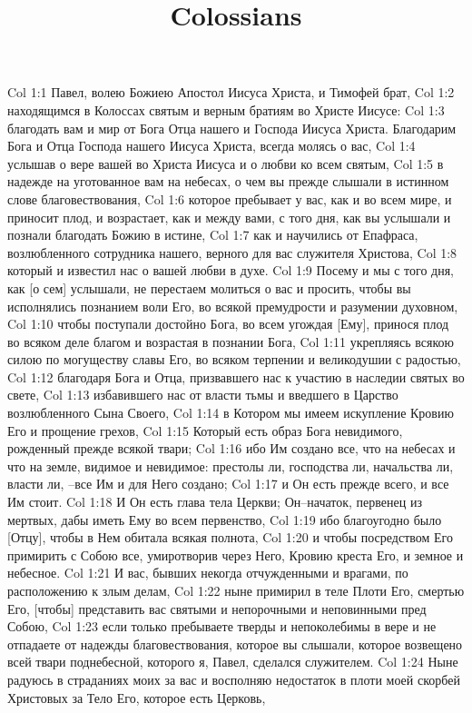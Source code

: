 

\title{Colossians}

Col 1:1  Павел, волею Божиею Апостол Иисуса Христа, и Тимофей брат,
Col 1:2  находящимся в Колоссах святым и верным братиям во Христе Иисусе:
Col 1:3  благодать вам и мир от Бога Отца нашего и Господа Иисуса Христа. Благодарим Бога и Отца Господа нашего Иисуса Христа, всегда молясь о вас,
Col 1:4  услышав о вере вашей во Христа Иисуса и о любви ко всем святым,
Col 1:5  в надежде на уготованное вам на небесах, о чем вы прежде слышали в истинном слове благовествования,
Col 1:6  которое пребывает у вас, как и во всем мире, и приносит плод, и возрастает, как и между вами, с того дня, как вы услышали и познали благодать Божию в истине,
Col 1:7  как и научились от Епафраса, возлюбленного сотрудника нашего, верного для вас служителя Христова,
Col 1:8  который и известил нас о вашей любви в духе.
Col 1:9  Посему и мы с того дня, как [о сем] услышали, не перестаем молиться о вас и просить, чтобы вы исполнялись познанием воли Его, во всякой премудрости и разумении духовном,
Col 1:10  чтобы поступали достойно Бога, во всем угождая [Ему], принося плод во всяком деле благом и возрастая в познании Бога,
Col 1:11  укрепляясь всякою силою по могуществу славы Его, во всяком терпении и великодушии с радостью,
Col 1:12  благодаря Бога и Отца, призвавшего нас к участию в наследии святых во свете,
Col 1:13  избавившего нас от власти тьмы и введшего в Царство возлюбленного Сына Своего,
Col 1:14  в Котором мы имеем искупление Кровию Его и прощение грехов,
Col 1:15  Который есть образ Бога невидимого, рожденный прежде всякой твари;
Col 1:16  ибо Им создано все, что на небесах и что на земле, видимое и невидимое: престолы ли, господства ли, начальства ли, власти ли, --все Им и для Него создано;
Col 1:17  и Он есть прежде всего, и все Им стоит.
Col 1:18  И Он есть глава тела Церкви; Он--начаток, первенец из мертвых, дабы иметь Ему во всем первенство,
Col 1:19  ибо благоугодно было [Отцу], чтобы в Нем обитала всякая полнота,
Col 1:20  и чтобы посредством Его примирить с Собою все, умиротворив через Него, Кровию креста Его, и земное и небесное.
Col 1:21  И вас, бывших некогда отчужденными и врагами, по расположению к злым делам,
Col 1:22  ныне примирил в теле Плоти Его, смертью Его, [чтобы] представить вас святыми и непорочными и неповинными пред Собою,
Col 1:23  если только пребываете тверды и непоколебимы в вере и не отпадаете от надежды благовествования, которое вы слышали, которое возвещено всей твари поднебесной, которого я, Павел, сделался служителем.
Col 1:24  Ныне радуюсь в страданиях моих за вас и восполняю недостаток в плоти моей скорбей Христовых за Тело Его, которое есть Церковь,
